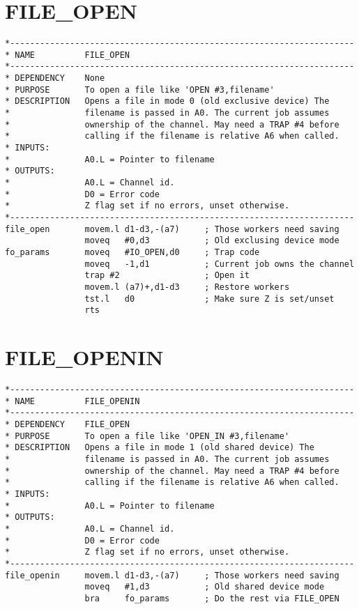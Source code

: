\section{FILE\_OPEN}
\label{ch9-FILE_OPEN}%

\begin{lstlisting}[firstnumber=1,caption={FILE\_OPEN}]
*---------------------------------------------------------------------
* NAME          FILE_OPEN
*---------------------------------------------------------------------
* DEPENDENCY    None
* PURPOSE       To open a file like 'OPEN #3,filename'
* DESCRIPTION   Opens a file in mode 0 (old exclusive device) The 
*               filename is passed in A0. The current job assumes
*               ownership of the channel. May need a TRAP #4 before 
*               calling if the filename is relative A6 when called.
* INPUTS:
*               A0.L = Pointer to filename
* OUTPUTS:
*               A0.L = Channel id.
*               D0 = Error code
*               Z flag set if no errors, unset otherwise.
*---------------------------------------------------------------------
file_open       movem.l d1-d3,-(a7)     ; Those workers need saving
                moveq   #0,d3           ; Old exclusing device mode
fo_params       moveq   #IO_OPEN,d0     ; Trap code
                moveq   -1,d1           ; Current job owns the channel
                trap #2                 ; Open it
                movem.l (a7)+,d1-d3     ; Restore workers
                tst.l   d0              ; Make sure Z is set/unset
                rts
\end{lstlisting}

\section{FILE\_OPENIN}
\label{ch9-FILE_OPENIN}%

\begin{lstlisting}[firstnumber=1,caption={FILE\_OPENIN}]
*---------------------------------------------------------------------
* NAME          FILE_OPENIN
*---------------------------------------------------------------------
* DEPENDENCY    FILE_OPEN
* PURPOSE       To open a file like 'OPEN_IN #3,filename'
* DESCRIPTION   Opens a file in mode 1 (old shared device) The 
*               filename is passed in A0. The current job assumes
*               ownership of the channel. May need a TRAP #4 before 
*               calling if the filename is relative A6 when called.
* INPUTS:
*               A0.L = Pointer to filename
* OUTPUTS:
*               A0.L = Channel id.
*               D0 = Error code
*               Z flag set if no errors, unset otherwise.
*---------------------------------------------------------------------
file_openin     movem.l d1-d3,-(a7)     ; Those workers need saving
                moveq   #1,d3           ; Old shared device mode
                bra     fo_params       ; Do the rest via FILE_OPEN
\end{lstlisting}

